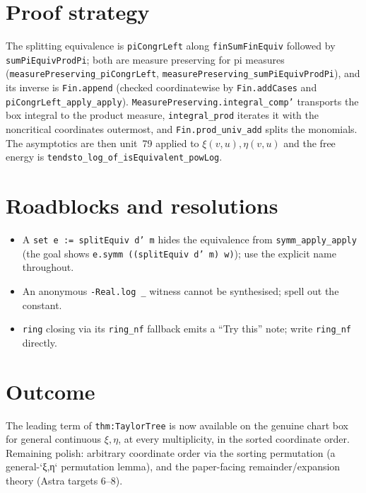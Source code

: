 \documentclass[11pt]{article}
\begin{document}
\section{Proof strategy}
The splitting equivalence is \texttt{piCongrLeft} along \texttt{finSumFinEquiv} followed by
\texttt{sumPiEquivProdPi}; both are measure preserving for pi measures
(\texttt{measurePreserving\_piCongrLeft}, \texttt{measurePreserving\_sumPiEquivProdPi}), and its
inverse is \texttt{Fin.append} (checked coordinatewise by \texttt{Fin.addCases} and
\texttt{piCongrLeft\_apply\_apply}). \texttt{MeasurePreserving.integral\_comp'} transports the box
integral to the product measure, \texttt{integral\_prod} iterates it with the noncritical coordinates
outermost, and \texttt{Fin.prod\_univ\_add} splits the monomials. The asymptotics are then unit~79
applied to $\xi(v,u),\eta(v,u)$ and the free energy is \texttt{tendsto\_log\_of\_isEquivalent\_powLog}.

\section{Roadblocks and resolutions}
\begin{itemize}
\item A \texttt{set e := splitEquiv d' m} hides the equivalence from \texttt{symm\_apply\_apply}
(the goal shows \texttt{e.symm ((splitEquiv d' m) w)}); use the explicit name throughout.
\item An anonymous \texttt{-Real.log \_} witness cannot be synthesised; spell out the constant.
\item \texttt{ring} closing via its \texttt{ring\_nf} fallback emits a ``Try this'' note; write
\texttt{ring\_nf} directly.
\end{itemize}

\section{Outcome}
The leading term of \texttt{thm:TaylorTree} is now available on the genuine chart box for general
continuous $\xi,\eta$, at every multiplicity, in the sorted coordinate order. Remaining polish: arbitrary
coordinate order via the sorting permutation (a general-`ξ,η` permutation lemma), and the paper-facing
remainder/expansion theory (Astra targets 6--8).
\end{document}
